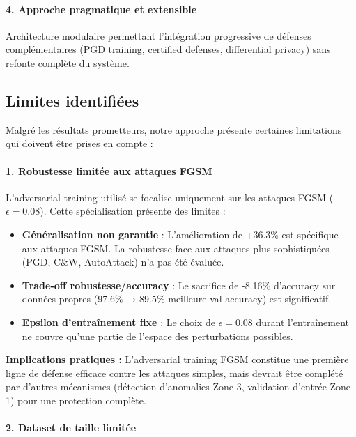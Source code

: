 \paragraph{4. Approche pragmatique et extensible}

Architecture modulaire permettant l'intégration progressive de défenses complémentaires (PGD training, certified defenses, differential privacy) sans refonte complète du système.

\subsection{Limites identifiées}

Malgré les résultats prometteurs, notre approche présente certaines limitations qui doivent être prises en compte :

\paragraph{1. Robustesse limitée aux attaques FGSM}

L'adversarial training utilisé se focalise uniquement sur les attaques FGSM ($\epsilon = 0.08$). Cette spécialisation présente des limites :

\begin{itemize}
    \item \textbf{Généralisation non garantie} : L'amélioration de +36.3\% est spécifique aux attaques FGSM. La robustesse face aux attaques plus sophistiquées (PGD, C\&W, AutoAttack) n'a pas été évaluée.
    \item \textbf{Trade-off robustesse/accuracy} : Le sacrifice de -8.16\% d'accuracy sur données propres (97.6\% → 89.5\% meilleure val accuracy) est significatif.
    \item \textbf{Epsilon d'entraînement fixe} : Le choix de $\epsilon = 0.08$ durant l'entraînement ne couvre qu'une partie de l'espace des perturbations possibles.
\end{itemize}

\textbf{Implications pratiques :} L'adversarial training FGSM constitue une première ligne de défense efficace contre les attaques simples, mais devrait être complété par d'autres mécanismes (détection d'anomalies Zone 3, validation d'entrée Zone 1) pour une protection complète.

\paragraph{2. Dataset de taille limitée}

